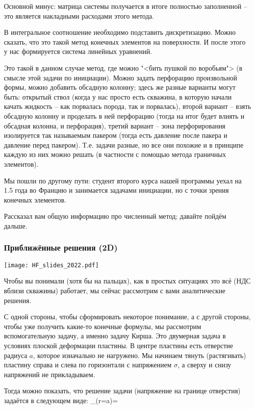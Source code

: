 \documentclass[main.tex]{subfiles}
\begin{document}
Основной минус: матрица системы получается в итоге полностью заполненной -- это является накладными расходами этого метода.

В интегральное соотношение необходимо подставить дискретизацию.
Можно сказать, что это такой метод конечных элементов на поверхности.
И после этого у нас формируется система линейных уравнений.

Это такой в данном случае метод, где можно "<бить пушкой по воробьям"> (в смысле этой задачи по инициации).
Можно задать перфорацию произвольной формы, можно добавить обсадную колонну; здесь же разные варианты могут быть: открытый ствол (когда у нас просто есть скважина, в которую начали качать жидкость -- как порвалась порода, так и порвалась), второй вариант -- взять обсадную колонну и проделать в ней перфорацию (тогда на итог будет влиять и обсадная колонна, и перфорация), третий вариант -- зона перфорирования изолируется так называемым пакером (тогда есть давление после пакера и давление перед пакером).
Т.е. задачи разные, но все они похожие и в принципе каждую из них можно решать (в частности с помощью метода граничных элементов).

Мы пошли по другому пути: студент второго курса нашей программы уехал на 1.5 года во Францию и занимается задачами инициации, но с точки зрения конечных элементов.

Рассказал вам общую информацию про численный метод; давайте пойдём дальше.

\subsubsection{Приближённые решения (2D)}

\texttt{[image: HF\_slides\_2022.pdf]}

Чтобы вы понимали (хотя бы на пальцах), как в простых ситуациях это всё (НДС вблизи скважины) работает, мы сейчас рассмотрим с вами аналитические решения.

С одной стороны, чтобы сформировать некоторое понимание, а с другой стороны, чтобы уже получить какие-то конечные формулы, мы рассмотрим вспомогательную задачу, а именно задачу Кирша.
Это двумерная задача в условиях плоской деформации пластины.
В центре пластины есть отверстие радиуса $a$, которое изначально не нагружено.
Мы начинаем тянуть (растягивать) пластину справа и слева по горизонтали с напряжением $\sigma$, а сверху и снизу напряжений не прикладываем.

Тогда можно показать, что решение задачи (напряжение на границе отверстия) задаётся в следующем виде:
\beq
\sigma_{\theta\theta}(r=a)=\sigma\cos{\!(2\theta)}
\eeq
\end{document}
